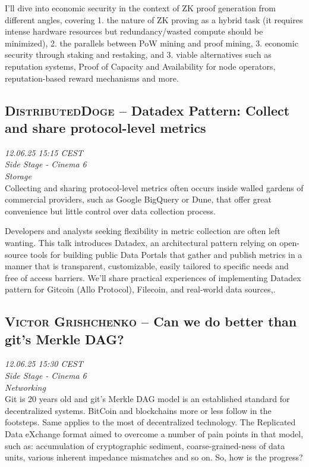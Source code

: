 I'll dive into economic security in the context of ZK proof generation from different angles, covering 1. the nature of ZK proving as a hybrid task (it requires intense hardware resources but redundancy/wasted compute should be minimized), 2. the parallels between PoW mining and proof mining, 3. economic security through staking and restaking, and 3. viable alternatives such as reputation systems, Proof of Capacity and Availability for node operators, reputation-based reward mechanisms and more.

\clearpage
\subsection {\textsc{DistributedDoge}  -- Datadex Pattern: Collect and share protocol-level metrics} \noindent \textit {12.06.25 15:15 CEST\\ Side Stage - Cinema 6\\ Storage}\\[1em] Collecting and sharing protocol-level metrics often occurs inside walled gardens of commercial providers, such as Google BigQuery or Dune, that offer great convenience but little control over data collection process.

Developers and analysts seeking flexibility in metric collection are often left wanting. This talk introduces Datadex, an architectural pattern relying on open-source tools for building public Data Portals that gather and publish metrics in a manner that is transparent, customizable, easily tailored to specific needs and free of access barriers. We’ll share practical experiences of implementing Datadex pattern for Gitcoin (Allo Protocol), Filecoin, and real-world data sources,.

\clearpage
\subsection {\textsc{Victor Grishchenko}  -- Can we do better than git's Merkle DAG?} \noindent \textit {12.06.25 15:30 CEST\\ Side Stage - Cinema 6\\ Networking}\\[1em] Git is 20 years old and git's Merkle DAG model is an established standard for decentralized systems. BitCoin and blockchains more or less follow in the footsteps. Same applies to the most of decentralized technology. The Replicated Data eXchange format aimed to overcome a number of pain points in that model, such as: accumulation of cryptographic sediment, coarse-grained-ness of data units, various inherent impedance mismatches and so on.
So, how is the progress?

